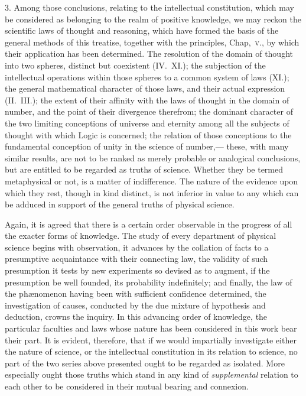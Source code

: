 \documentclass[oneside]{book}
\begin{document}
3. Among those conclusions, relating to the intellectual constitution, which may be considered as belonging to the realm of
positive knowledge, we may reckon the scientific laws of thought
and reasoning, which have formed the basis of the general methods of this treatise, together with the principles, Chap,~\textsc{v.}, by
which their application has been determined. The resolution of
the domain of thought into two spheres, distinct but coexistent
(IV.~XI.); the subjection of the intellectual operations within
those spheres to a common system of laws (XI.); the general
mathematical character of those laws, and their actual expression
(II.~III.); the extent of their affinity with the laws of thought in
the domain of number, and the point of their divergence therefrom; the dominant character of the two limiting conceptions of
universe and eternity among all the subjects of thought with
which Logic is concerned; the relation of those conceptions to
the fundamental conception of unity in the science of number,---
these, with many similar results, are not to be ranked as merely
probable or analogical conclusions, but are entitled to be regarded as truths of science. Whether they be termed metaphysical or not, is a matter of indifference. The nature of the
evidence upon which they rest, though in kind distinct, is not
inferior in value to any which can be adduced in support of the
general truths of physical science.

Again, it is agreed that there is a certain order observable in the progress of all the exacter forms of knowledge.
The study of every department of physical science begins with
observation, it advances by the collation of facts to a presumptive acquaintance with their connecting law, the validity of
such presumption it tests by new experiments so devised as to
augment, if the presumption be well founded, its probability indefinitely; and finally, the law of the ph{\ae}nomenon having been
with sufficient confidence determined, the investigation of causes,
conducted by the due mixture of hypothesis and deduction,
crowns the inquiry. In this advancing order of knowledge, the
particular faculties and laws whose nature has been considered
in this work bear their part. It is evident, therefore, that if we
would impartially investigate either the nature of science, or
the intellectual constitution in its relation to science, no part of
the two series above presented ought to be regarded as isolated.
More especially ought those truths which stand in any kind of
\emph{supplemental} relation to each other to be considered in their mutual bearing and connexion.
\end{document}
